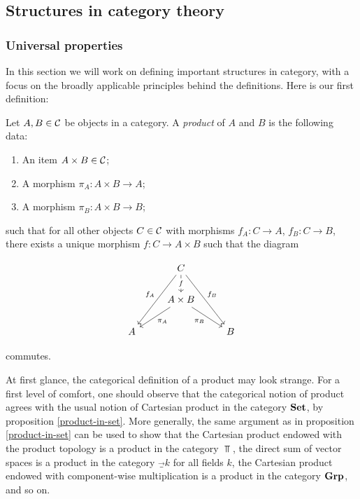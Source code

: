 \subsection{Structures in category theory}

\subsubsection{Universal properties}

In this section we will work on defining important structures in category, with a focus on the broadly applicable principles behind the definitions. Here is our first definition:

\begin{defn}[Product]\label{product-definition} Let $A,B\in {\mathcal C}$ be objects in a category. A {\em product} of $A$ and $B$ is the following data:

\begin{enumerate}
\item An item $A\times B\in {\mathcal C}$;
\item A morphism $\pi_A:A\times B\to A$;
\item A morphism $\pi_B:A\times B\to B$;
\end{enumerate}

such that for all other objects $C\in {\mathcal C}$ with morphisms $f_A:C\to A$, $f_B:C\to B$, there exists a unique morphism $f:C\to A\times B$ such that the diagram

\[\begin{tikzcd}
	& C \\
	& {A\times B} \\
	A && B
	\arrow["f"{description}, from=1-2, to=2-2]
	\arrow["{f_A}"', from=1-2, to=3-1]
	\arrow["{f_B}", from=1-2, to=3-3]
	\arrow["{\pi_A}", from=2-2, to=3-1]
	\arrow["{\pi_B}"', from=2-2, to=3-3]
\end{tikzcd}\]

commutes.

\raggedleft\qedsymbol{}
\end{defn}

\begin{rem} At first glance, the categorical definition of a product may look strange. For a first level of comfort, one should observe that the categorical notion of product agrees with the usual notion of Cartesian product in the category ${\bf Set}$, by proposition \ref{product-in-set}. More generally, the same argument as in proposition \ref{product-in-set} can be used to show that the Cartesian product endowed with the product topology is a product in the category $\Top$, the direct sum of vector spaces is a product in the category $\Vec_k$ for all fields $k$,  the Cartesian product endowed with component-wise multiplication is a product in the category ${\bf Grp}$, and so on.
\end{rem}

